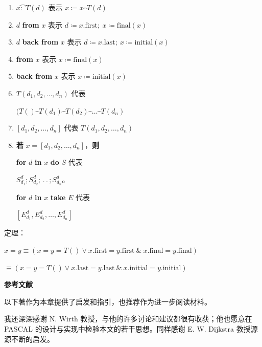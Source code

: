\begin{enumerate}[wide, nosep, label=(\arabic*)]
	\tabto*{12.6em}\& $\text{final}(x) \leqslant \text{final}(y)))$

	\noindent	
	简写：

	\item  $x\wideparen{\text{:} \ \ }T(d)$ \tabto*{11em} 表示 $x \coloneq x\wideparen{\ \ }T(d)$
	\item $d$ \textbf{from} $x$\tabto*{11em} 表示 $d\coloneq x.\text{first};\ x\coloneq \text{final}(x)$
	\item $d$ \textbf{back from} $x$\tabto*{11em} 表示 $d\coloneq x.\text{last};\ x\coloneq \text{initial}(x)$
	\item \textbf{from} $x$\tabto*{11em} 表示 $x\coloneq \text{final}(x)$
	\item \textbf{back from} $x$\tabto*{11em} 表示 $x\coloneq \text{initial}(x)$
	\item $T(d_1, d_2, \dots, d_n)$ 代表
	
	\qquad\quad $(T()\wideparen{\ \ }T(d_1)\wideparen{\ \ }T(d_2)\wideparen{\ \ }\dots\wideparen{\ \ }T(d_n)$
	
	\item $[d_1, d_2, \dots, d_n]$ 代表 $T(d_1, d_2, \dots, d_n)$
	\item \textbf{若} $x = [d_1, d_2, \dots, d_n]$，\textbf{则}
	
	\qquad \quad \textbf{for} $d$ \textbf{in} $x$ \textbf{do} $S$ 代表

	\qquad \qquad \qquad $S_{d_1}^d; S_{d_2}^d; \,.\,.\,; S_{d_n}^d$。


	\qquad \quad \textbf{for} $d$ \textbf{in} $x$ \textbf{take} $E$ 代表
	
	\qquad \qquad \qquad $[E_{d_1}^d, E_{d_2}^d, \dots, E_{d_n}^d]$

\end{enumerate}

\noindent
定理：

	\quad $x = y \equiv (x = y = T() \lor x.\text{first} = y.\text{first}\ \&\ x.\text{final} = y.\text{final})$

	\tabto*{4.9em} $\equiv (x = y = T() \lor x.\text{last} = y.\text{last}\ \&\ x.\text{initial} = y.\text{initial})$
	\bigskip

\noindent
\textbf{参考文献}
\medskip
\nopagebreak

\noindent
以下著作为本章提供了启发和指引，也推荐作为进一步阅读材料。

我还深深感谢 N. Wirth 教授，与他的许多讨论和建议都很有收获；他也愿意在 PASCAL 的设计与实现中检验本文的若干思想。同样感谢 E. W. Dijkstra 教授源源不断的启发。
\medskip

